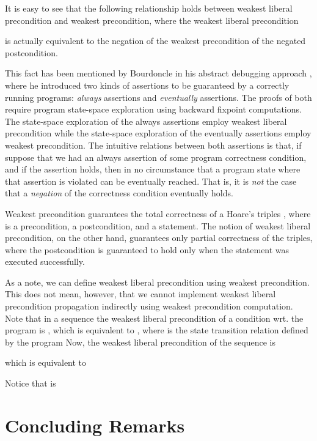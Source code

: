 \documentclass[times]{elsarticle}
\begin{document}
It is easy to see that the following relationship holds between 
weakest liberal precondition and weakest precondition, where the 
weakest liberal precondition 

is actually equivalent to the negation of the weakest precondition of 
the negated postcondition. 

This fact has been mentioned by Bourdoncle in his abstract debugging 
approach \cite{bourdoncle93debug}, where he introduced two kinds of 
assertions to be guaranteed by a correctly running programs:
\emph{always\/} assertions and \emph{eventually\/} assertions. The 
proofs of both require program state-space exploration using backward 
fixpoint computations. The state-space exploration of the always 
assertions employ weakest liberal precondition while the state-space 
exploration of the eventually assertions employ weakest 
precondition. The intuitive relations between both assertions is that,
if suppose that we had an always assertion of some program correctness 
condition, and if the assertion holds, then in no circumstance that a 
program state where that assertion is violated can be eventually 
reached. That is, it is \emph{not\/} the case that a \emph{negation\/}
of the correctness condition eventually holds. 

Weakest precondition guarantees the total correctness of 
a Hoare's triples , where 
 is a precondition,  a postcondition, and 
a statement. The notion of weakest liberal precondition, on the other 
hand, guarantees only partial correctness of the triples, where the 
postcondition is guaranteed to hold only when the statement was 
executed successfully. 

As a note, we can define weakest liberal precondition using weakest
precondition.  This does not mean, however, that we cannot implement
weakest liberal precondition propagation indirectly using weakest
precondition computation. Note that in a sequence  the
weakest liberal precondition of a condition  wrt. the program  is
, which is equivalent to , where  is
the state transition relation defined by the program  Now, the
weakest liberal precondition of the sequence is

which is equivalent to

Notice that  is 

\section{Concluding Remarks}
\label{sec:conclusion}
\end{document}
